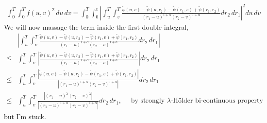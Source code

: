 \documentclass[a4paper,12pt]{article}
\theoremstyle{definition}
\begin{document}
\begin{enumerate}
\begin{enumerate}[(a)]
\begin{align*}
\int_{0}^{T}\int_{0}^{T}f(u,v)^2\,du\,dv = \int_{0}^{T} \int_{0}^{v}\left|\int_{u}^{T}\int_{v}^{T}\frac{\tilde{\psi}(u,v)-\tilde{\psi}(u,r_2)-\tilde{\psi}(r_1,v)+\tilde{\psi}(r_1,r_2)}{(r_1-u)^{1+\alpha}(r_2-v)^{1+\alpha}}dr_2\,dr_1\right|^2du\,dv
\end{align*}
We will now massage the term inside the first double integral,
\begin{align*}
&\left|\int_{u}^{T}\int_{v}^{T}\frac{\tilde{\psi}(u,v)-\tilde{\psi}(u,r_2)-\tilde{\psi}(r_1,v)+\tilde{\psi}(r_1,r_2)}{(r_1-u)^{1+\alpha}(r_2-v)^{1+\alpha}}dr_2\,dr_1\right| \\
\leq &\int_{u}^{T}\int_{v}^{T}\left|\frac{\tilde{\psi}(u,v)-\tilde{\psi}(u,r_2)-\tilde{\psi}(r_1,v)+\tilde{\psi}(r_1,r_2)}{(r_1-u)^{1+\alpha}(r_2-v)^{1+\alpha}}\right|dr_2\,dr_1\\
\leq &\int_{u}^{T}\int_{v}^{T}\frac{\left|\tilde{\psi}(u,v)-\tilde{\psi}(u,r_2)-\tilde{\psi}(r_1,v)+\tilde{\psi}(r_1,r_2)\right|}{\left|(r_1-u)^{1+\alpha}(r_2-v)^{1+\alpha}\right|}dr_2\,dr_1\\
\leq &\int_{u}^{T}\int_{v}^{T}\frac{\left|(r_1-u)^\lambda(r_2-v)^\lambda\right|}{\left|(r_1-u)^{1+\alpha}(r_2-v)^{1+\alpha}\right|}dr_2\,dr_1, \quad \text{ by strongly $\lambda$-H\"{o}lder bi-continuous property}
\end{align*}
but I'm stuck.


\end{enumerate}


\end{enumerate}
\end{document}
